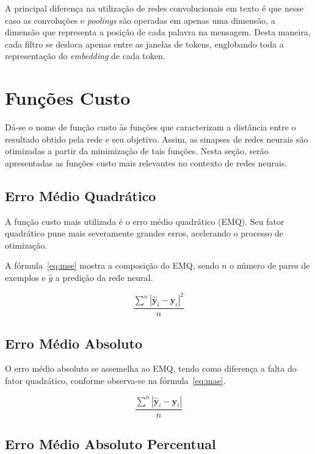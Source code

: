 A principal diferença na utilização de redes convolucionais em texto é que nesse caso as convoluções e \textit{poolings}
são operadas em apenas uma dimensão, a dimensão que representa a posição de cada palavra na mensagem.
Desta maneira, cada filtro se desloca apenas entre as janelas de tokens, englobando toda a representação do
\textit{embedding} de cada token.

\section{Funções Custo} \label{sec:custo}

Dá-se o nome de função custo às funções que caracterizam a distância entre o resultado obtido pela rede e seu objetivo.
Assim, as sinapses de redes neurais são otimizadas a partir da minimização de tais funções.
Nesta seção, serão apresentadas as funções custo mais relevantes no contexto de redes neurais.

\subsection{Erro Médio Quadrático}

A função custo mais utilizada é o erro médio quadrático (EMQ).
Seu fator quadrático pune mais severamente grandes erros, acelerando o processo de otimização.

A fórmula~\ref{eq:mse} mostra a composição do EMQ, sendo $n$ o número de pares de exemplos e $\hat{y}$ a predição da
rede neural.

\begin{equation} \label{eq:mse}
    \frac{\displaystyle\sum^n |\hat{\mathbf{y}}_i - \mathbf{y}_i|^2}{n}
\end{equation}

\subsection{Erro Médio Absoluto}

O erro médio absoluto se assemelha ao EMQ, tendo como diferença a falta do fator quadrático, conforme observa-se na fórmula~\ref{eq:mae}.

\begin{equation} \label{eq:mae}
    \frac{\displaystyle\sum^n |\hat{\mathbf{y}}_i - \mathbf{y}_i|}{n}
\end{equation}

\subsection{Erro Médio Absoluto Percentual}

